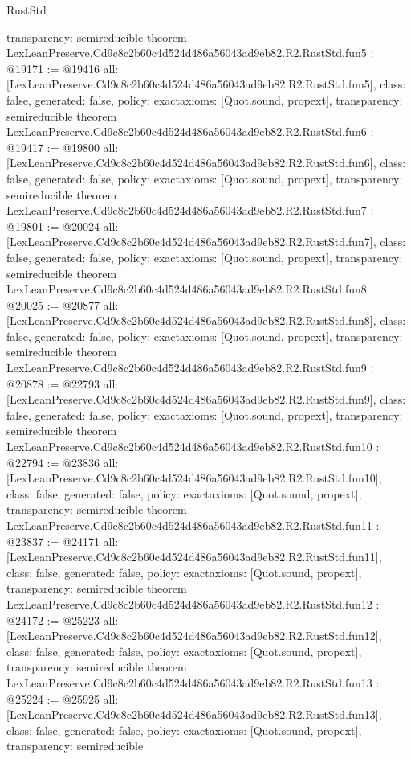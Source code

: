 \begin{lexlean}{RustStd}
\begin{coremodule}
{  transparency: semireducible
}
theorem LexLeanPreserve.Cd9c8c2b60c4d524d486a56043ad9eb82.R2.RustStd.fun5 : @19171 := @19416 {
  all: [LexLeanPreserve.Cd9c8c2b60c4d524d486a56043ad9eb82.R2.RustStd.fun5],
  class: false,
  generated: false,
  policy: exact{axioms: [Quot.sound, propext]},
  transparency: semireducible
}
theorem LexLeanPreserve.Cd9c8c2b60c4d524d486a56043ad9eb82.R2.RustStd.fun6 : @19417 := @19800 {
  all: [LexLeanPreserve.Cd9c8c2b60c4d524d486a56043ad9eb82.R2.RustStd.fun6],
  class: false,
  generated: false,
  policy: exact{axioms: [Quot.sound, propext]},
  transparency: semireducible
}
theorem LexLeanPreserve.Cd9c8c2b60c4d524d486a56043ad9eb82.R2.RustStd.fun7 : @19801 := @20024 {
  all: [LexLeanPreserve.Cd9c8c2b60c4d524d486a56043ad9eb82.R2.RustStd.fun7],
  class: false,
  generated: false,
  policy: exact{axioms: [Quot.sound, propext]},
  transparency: semireducible
}
theorem LexLeanPreserve.Cd9c8c2b60c4d524d486a56043ad9eb82.R2.RustStd.fun8 : @20025 := @20877 {
  all: [LexLeanPreserve.Cd9c8c2b60c4d524d486a56043ad9eb82.R2.RustStd.fun8],
  class: false,
  generated: false,
  policy: exact{axioms: [Quot.sound, propext]},
  transparency: semireducible
}
theorem LexLeanPreserve.Cd9c8c2b60c4d524d486a56043ad9eb82.R2.RustStd.fun9 : @20878 := @22793 {
  all: [LexLeanPreserve.Cd9c8c2b60c4d524d486a56043ad9eb82.R2.RustStd.fun9],
  class: false,
  generated: false,
  policy: exact{axioms: [Quot.sound, propext]},
  transparency: semireducible
}
theorem LexLeanPreserve.Cd9c8c2b60c4d524d486a56043ad9eb82.R2.RustStd.fun10 : @22794 := @23836 {
  all: [LexLeanPreserve.Cd9c8c2b60c4d524d486a56043ad9eb82.R2.RustStd.fun10],
  class: false,
  generated: false,
  policy: exact{axioms: [Quot.sound, propext]},
  transparency: semireducible
}
theorem LexLeanPreserve.Cd9c8c2b60c4d524d486a56043ad9eb82.R2.RustStd.fun11 : @23837 := @24171 {
  all: [LexLeanPreserve.Cd9c8c2b60c4d524d486a56043ad9eb82.R2.RustStd.fun11],
  class: false,
  generated: false,
  policy: exact{axioms: [Quot.sound, propext]},
  transparency: semireducible
}
theorem LexLeanPreserve.Cd9c8c2b60c4d524d486a56043ad9eb82.R2.RustStd.fun12 : @24172 := @25223 {
  all: [LexLeanPreserve.Cd9c8c2b60c4d524d486a56043ad9eb82.R2.RustStd.fun12],
  class: false,
  generated: false,
  policy: exact{axioms: [Quot.sound, propext]},
  transparency: semireducible
}
theorem LexLeanPreserve.Cd9c8c2b60c4d524d486a56043ad9eb82.R2.RustStd.fun13 : @25224 := @25925 {
  all: [LexLeanPreserve.Cd9c8c2b60c4d524d486a56043ad9eb82.R2.RustStd.fun13],
  class: false,
  generated: false,
  policy: exact{axioms: [Quot.sound, propext]},
  transparency: semireducible
}
\end{coremodule}
\end{lexlean}
